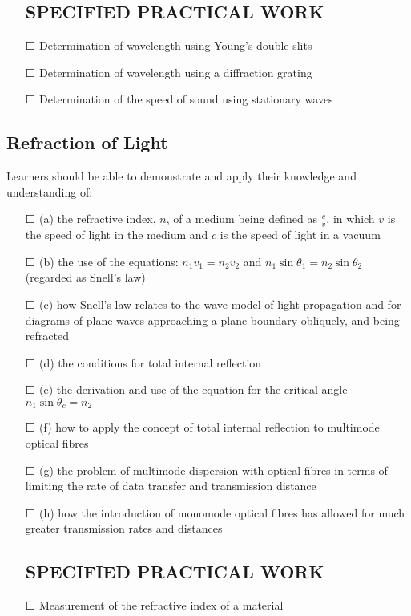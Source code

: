 \begin{itemize}
	\subsection*{SPECIFIED PRACTICAL WORK}
	\item[\Large{$\Square$}] Determination of wavelength using Young’s double slits
	\item[\Large{$\Square$}] Determination of wavelength using a diffraction grating
	\item[\Large{$\Square$}] Determination of the speed of sound using stationary waves
\end{itemize}
\subsection{Refraction of Light}Learners should be able to demonstrate and apply their knowledge and
understanding of:
\begin{itemize}
	\item[\Large{$\Square$}] (a) the refractive index, $n$, of a medium being defined as \( \frac{c}{v} \), in which \(v\) is the speed of light in the medium and \(c\) is the speed of light in a vacuum
	\item[\Large{$\Square$}]	(b) the use of the equations: \sq \( n_{1}v_{1}=n_{2}v_{2} \) and \sq \( n_{1} \sin \theta_{1} = n_{2}\sin \theta_{2}  \) (regarded as	Snell’s law)
	\item[\Large{$\Square$}]	(c) how Snell's law relates to the wave model of light propagation and for diagrams of plane waves approaching a plane boundary obliquely, and being refracted
	\item[\Large{$\Square$}]	(d) the conditions for total internal reflection
	\item[\Large{$\Square$}]	(e) the derivation and use of the equation for the critical angle \( n_{1}\sin \theta_{c} = n_{2} \)
	\item[\Large{$\Square$}]	(f) how to apply the concept of total internal reflection to multimode optical fibres
	\item[\Large{$\Square$}]	(g) the problem of multimode dispersion with optical fibres in terms of limiting the	rate of data transfer and transmission distance
	\item[\Large{$\Square$}]	(h) how the introduction of monomode optical fibres has allowed for much greater transmission rates and distances
	\subsection*{SPECIFIED PRACTICAL WORK}
	\item[\Large{$\Square$}] Measurement of the refractive index of a material
\end{itemize}
